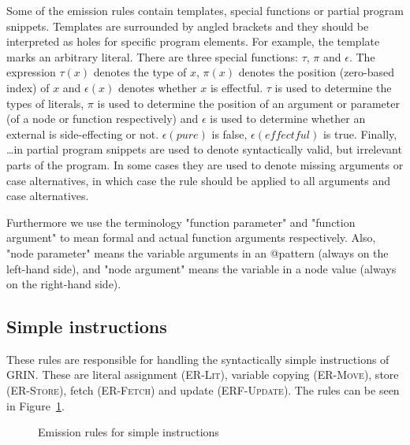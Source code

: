 \documentclass[main.tex]{subfiles}
\begin{document}
  Some of the emission rules contain templates, special functions or partial program snippets. Templates are surrounded by angled brackets and they should be interpreted as holes for specific program elements. For example, the template  marks an arbitrary literal. There are three special functions: $\tau$, $\pi$ and $\epsilon$. The expression $\tau(x)$ denotes the type of $x$, $\pi(x)$ denotes the position (zero-based index) of $x$ and $\epsilon(x)$ denotes whether $x$ is effectful. $\tau$ is used to determine the types of literals, $\pi$ is used to determine the position of an argument or parameter (of a node or function respectively) and $\epsilon$ is used to determine whether an external is side-effecting or not. $\epsilon(pure)$ is false, $\epsilon(effectful)$ is true. Finally, \dots in partial program snippets are used to denote syntactically valid, but irrelevant parts of the program. In some cases they are used to denote missing arguments or case alternatives, in which case the rule should be applied to all arguments and case alternatives.
  
  Furthermore we use the terminology "function parameter" and "function argument" to mean formal and actual function arguments respectively. Also, "node parameter" means the variable arguments in an @pattern (always on the left-hand side), and "node argument" means the variable in a node value (always on the right-hand side).
  
  \subsection{Simple instructions}
  
  These rules are responsible for handling the syntactically simple instructions of GRIN. These are literal assignment (\textsc{ER-Lit}), variable copying (\textsc{ER-Move}), store (\textsc{ER-Store}), fetch (\textsc{ER-Fetch}) and update (\textsc{ERF-Update}). The rules can be seen in Figure~\ref{fig:er-simple}. 

  \begin{figure}[h]
  \caption{Emission rules for simple instructions}
  \label{fig:er-simple}
  \end{figure}
\end{document}
